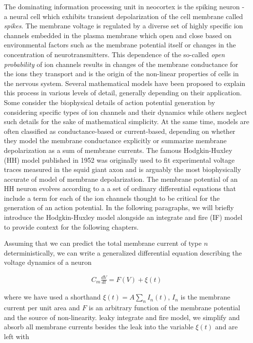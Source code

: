 \documentclass{ucetd}
\begin{document}
The dominating information processing unit in neocortex is the spiking neuron - a neural cell which exhibits transient depolarization of the cell membrane called \emph{spikes}. The membrane voltage is regulated by a diverse set of highly specific ion channels embedded in the plasma membrane which open and close based on environmental factors such as the membrane potential itself or changes in the concentration of neurotransmitters. This dependence of the so-called \emph{open probability} of ion channels results in changes of the membrane conductance for the ions they transport and is the origin of the non-linear properties of  cells in the nervous system. Several mathematical models have been proposed to explain this process in various levels of detail, generally depending on their application. Some consider the biophysical details of action potential generation by considering specific types of ion channels and their dynamics while others neglect such details for the sake of mathematical simplicity. At the same time, models are often classified as conductance-based or current-based, depending on whether they model the membrane conductance explicitly or summarize membrane depolarization as a sum of membrane currents. The famous Hodgkin-Huxley (HH) model published in 1952 was originally used to fit experimental voltage traces measured in the squid giant axon and is arguably the most biophysically accurate of model of membrane depolarization. The membrane potential of an HH neuron evolves according to a a set of ordinary differential equations that include a term for each of the ion channels thought to be critical for the generation of an action potential. In the following paragraphs, we will briefly introduce the Hodgkin-Huxley model alongside an integrate and fire (IF) model to provide context for the following chapters.

Assuming that we can predict the total membrane current of type $n$ deterministically, we can write a generalized differential equation describing the voltage dynamics of a neuron

\begin{align}
C_{m}\frac{dV}{dt} = F(V) + \xi(t)
\end{align}

where we have used a shorthand $\xi(t) = A\sum_{n} I_{n}(t)$, $I_{n}$ is the membrane current per unit area and $F$ is an arbitrary function of the membrane potential and the source of non-linearity. leaky integrate and fire model, we simplify and absorb all membrane currents besides the leak into the variable $\xi(t)$ and are left with
\end{document}
